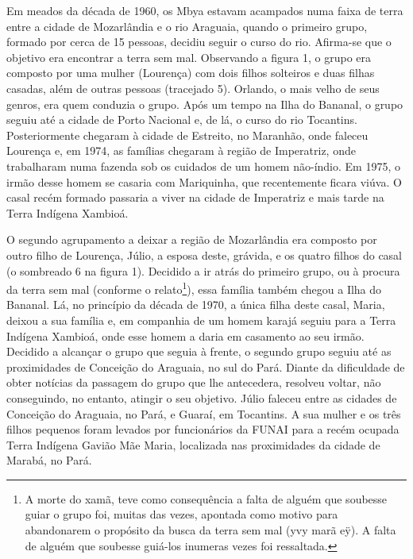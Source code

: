 \documentclass{article}
\begin{document}
Em meados da d\'ecada de 1960, os Mbya estavam acampados numa faixa de
terra entre a cidade de Mozarl\^andia e o rio Araguaia, quando o
primeiro grupo, formado por cerca de 15 pessoas, decidiu seguir o curso
do rio. Afirma-se que o objetivo era encontrar a terra sem mal.
Observando a figura 1, o grupo era composto por uma mulher
(Louren\c{c}a) com dois filhos solteiros e duas filhas casadas, al\'em
de outras pessoas (tracejado 5). Orlando, o mais velho de seus genros,
era quem conduzia o grupo. Ap\'os um tempo na Ilha do Bananal, o grupo
seguiu at\'e a cidade de Porto Nacional e, de l\'a, o curso do rio
Tocantins. Posteriormente chegaram \`a cidade de Estreito, no
Maranh\~ao, onde faleceu Louren\c{c}a e, em 1974, as fam\'ilias
chegaram \`a regi\~ao de Imperatriz, onde trabalharam numa fazenda sob
os cuidados de um homem n\~ao-\'indio. Em 1975, o irm\~ao desse homem
se casaria com Mariquinha, que recentemente ficara vi\'uva. O casal
rec\'em formado passaria a viver na cidade de Imperatriz e mais tarde
na Terra Ind\'igena Xambio\'a. 

O segundo agrupamento a deixar a regi\~ao de Mozarl\^andia era composto
por outro filho de Louren\c{c}a, J\'ulio, a esposa deste, gr\'avida, e
os quatro filhos do casal (o sombreado 6 na figura 1). Decidido a ir
atr\'as do primeiro grupo, ou \`a procura da terra sem mal (conforme o
relato\footnote{ A morte do xam\~a, teve como consequ\^encia a falta de
algu\'em que soubesse guiar o grupo foi, muitas das vezes, apontada
como motivo para abandonarem o prop\'osito da busca da terra sem mal
(yvy mar\~a e\"y). A falta de algu\'em que soubesse gui\'a-los inumeras
vezes foi ressaltada.}), essa fam\'ilia tamb\'em chegou a Ilha do
Bananal. L\'a, no princ\'ipio da d\'ecada de 1970, a \'unica filha
deste casal, Maria, deixou a sua fam\'ilia e, em companhia de um homem
karaj\'a seguiu para a Terra Ind\'igena Xambio\'a, onde esse homem a
daria em casamento ao seu irm\~ao. Decidido a alcan\c{c}ar o grupo que
seguia \`a frente, o segundo grupo seguiu at\'e as proximidades de
Concei\c{c}\~ao do Araguaia, no sul do Par\'a. Diante da dificuldade de
obter not\'icias da passagem do grupo que lhe antecedera, resolveu
voltar, n\~ao conseguindo, no entanto, atingir o seu objetivo. J\'ulio
faleceu entre as cidades de Concei\c{c}\~ao do Araguaia, no Par\'a, e
Guara\'i, em Tocantins. A sua mulher e os tr\^es filhos pequenos foram
levados por funcion\'arios da FUNAI para a rec\'em ocupada Terra
Ind\'igena Gavi\~ao M\~ae Maria, localizada nas proximidades da cidade
de Marab\'a, no Par\'a. 
\end{document}
